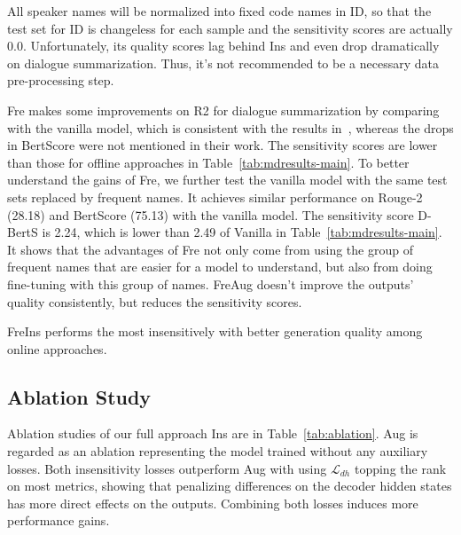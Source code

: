 



All speaker names will be normalized into fixed code names in {ID}, so that the test set for ID is changeless for each sample and the sensitivity scores are actually 0.0. Unfortunately, its quality scores lag behind Ins and even drop dramatically on dialogue summarization. Thus, it's not recommended to be a necessary data pre-processing step.  %

{Fre} makes some improvements on R2 for dialogue summarization by comparing with the vanilla model, which is consistent with the results in~\cite{khalifa2021bag}, whereas the drops in BertScore were not mentioned in their work. The sensitivity scores are lower than those for offline approaches in Table~\ref{tab:mdresults-main}. To better understand the gains of Fre, we further test the vanilla model with the same test sets replaced by frequent names. It achieves similar performance on Rouge-2 (28.18) and BertScore (75.13) with the vanilla model. The sensitivity score D-BertS is 2.24, which is lower than 2.49 of Vanilla in Table~\ref{tab:mdresults-main}. It shows that {the advantages of Fre not only come from using the group of frequent names} that are easier for a model to understand, {but also from doing fine-tuning with this group of names}. FreAug doesn't improve the outputs' quality consistently, but reduces the sensitivity scores. %

{FreIns} performs the most insensitively with better generation quality among online approaches.


\subsection{Ablation Study}

Ablation studies of our full approach Ins are in Table~\ref{tab:ablation}.
Aug is regarded as an ablation representing the model trained without any auxiliary losses.
Both insensitivity losses outperform Aug with using $\mathcal{L}_{dh}$ topping the rank on most metrics, showing that penalizing differences on the decoder hidden states has more direct effects on the outputs.
Combining both losses induces more performance gains.


